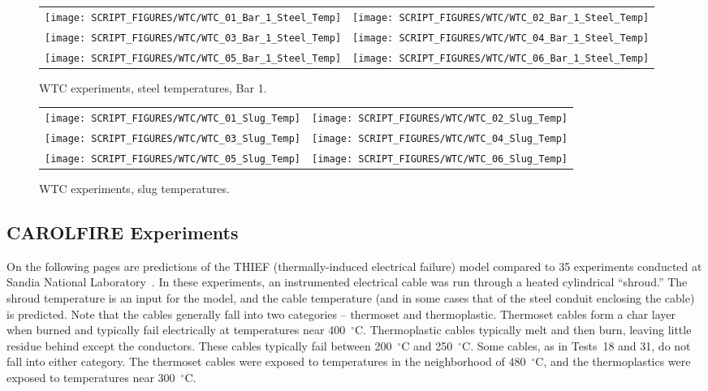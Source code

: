 \begin{figure}[p]
\begin{tabular*}{\textwidth}{l@{\extracolsep{\fill}}r}
\texttt{[image: SCRIPT\_FIGURES/WTC/WTC\_01\_Bar\_1\_Steel\_Temp]} &
\texttt{[image: SCRIPT\_FIGURES/WTC/WTC\_02\_Bar\_1\_Steel\_Temp]} \\
\texttt{[image: SCRIPT\_FIGURES/WTC/WTC\_03\_Bar\_1\_Steel\_Temp]} &
\texttt{[image: SCRIPT\_FIGURES/WTC/WTC\_04\_Bar\_1\_Steel\_Temp]} \\
\texttt{[image: SCRIPT\_FIGURES/WTC/WTC\_05\_Bar\_1\_Steel\_Temp]} &
\texttt{[image: SCRIPT\_FIGURES/WTC/WTC\_06\_Bar\_1\_Steel\_Temp]}
\end{tabular*}
\caption{WTC experiments, steel temperatures, Bar 1.}
\label{NIST_WTC_Bar_1_Steel_Temp}
\end{figure}


\begin{figure}[p]
\begin{tabular*}{\textwidth}{l@{\extracolsep{\fill}}r}
\texttt{[image: SCRIPT\_FIGURES/WTC/WTC\_01\_Slug\_Temp]} &
\texttt{[image: SCRIPT\_FIGURES/WTC/WTC\_02\_Slug\_Temp]} \\
\texttt{[image: SCRIPT\_FIGURES/WTC/WTC\_03\_Slug\_Temp]} &
\texttt{[image: SCRIPT\_FIGURES/WTC/WTC\_04\_Slug\_Temp]} \\
\texttt{[image: SCRIPT\_FIGURES/WTC/WTC\_05\_Slug\_Temp]} &
\texttt{[image: SCRIPT\_FIGURES/WTC/WTC\_06\_Slug\_Temp]}
\end{tabular*}
\caption{WTC experiments, slug temperatures.}
\label{NIST_WTC_Slug_Temp}
\end{figure}

\clearpage


\subsection{CAROLFIRE Experiments}

On the following pages are predictions of the THIEF (thermally-induced electrical failure) model compared to 35 experiments conducted at Sandia National Laboratory~\cite{CAROLFIRE}. In these experiments, an instrumented electrical cable was run through a heated cylindrical ``shroud.'' The shroud temperature is an input for the model, and the cable temperature (and in some cases that of the steel conduit enclosing the cable) is predicted. Note that the cables generally fall into two categories -- thermoset and thermoplastic. Thermoset cables form a char layer when burned and typically fail electrically at temperatures near 400~$^\circ$C. Thermoplastic cables typically melt and then burn, leaving little residue behind except the conductors. These cables typically fail between 200~$^\circ$C and 250~$^\circ$C. Some cables, as in Tests~18 and 31, do not fall into either category. The thermoset cables were exposed to temperatures in the neighborhood of 480~$^\circ$C, and the thermoplastics were exposed to temperatures near 300~$^\circ$C.

